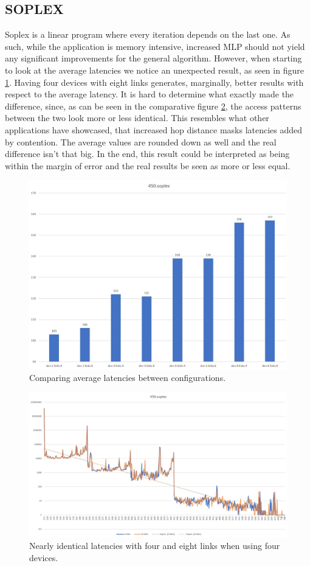 \subsection{SOPLEX}
Soplex is a linear program where every iteration depends on the last one. As such, while the application is memory intensive, increased MLP should not yield any significant improvements for the general algorithm. However, when starting to look at the average latencies we notice an unexpected result, as seen in figure \ref{Memory-access-450-average-latency}. Having four devices with eight links generates, marginally, better results with respect to the average latency. It is hard to determine what exactly made the difference, since, as can be seen in the comparative figure \ref{Memory-access-450-4-dev-4-8-links}, the access patterns between the two look more or less identical. This resembles what other applications have showcased, that increased hop distance masks latencies added by contention. The average values are rounded down as well and the real difference isn't that big. In the end, this result could be interpreted as being within the margin of error and the real results be seen as more or less equal.

\begin{figure}[!h]
    \centering
    \includegraphics[width=0.75\linewidth]{figure/450-averages.jpg}
    \caption{Comparing average latencies between configurations.}
    \label{Memory-access-450-average-latency}
\end{figure}

\begin{figure}[!h]
    \centering
    \includegraphics[width=0.75\linewidth]{figure/450-4.4-8.jpg}
    \caption{Nearly identical latencies with four and eight links when using four devices.}
    \label{Memory-access-450-4-dev-4-8-links}
\end{figure}

